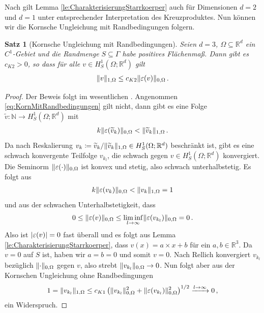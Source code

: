 \documentclass{scrartcl}
\newcounter{everything}
\newtheorem{theorem}[everything]{Satz}
\def\R{\mathbb{R}}
\def\N{\mathbb{N}}
\def\e{\varepsilon}
\DeclarePairedDelimiter{\abs}{\lvert}{\rvert}
\DeclarePairedDelimiter{\norm}{\lVert}{\rVert}
\begin{document}
Nach \cite[S.115]{Kik-1988} gilt Lemma \ref{le:CharakterisierungStarrkoerper} auch für Dimensionen $d=2$ und $d=1$ unter entsprechender Interpretation des Kreuzproduktes. Nun können wir die Kornsche Ungleichung mit Randbedingungen folgern.

\begin{theorem}[Kornsche Ungleichung mit Randbedingungen]
\label{th:KornMitRandbedingungen}
Seien $d=3$, $\Omega\subseteq\R^d$ ein $C^1$-Gebiet und die Randmenge $S\subseteq\Gamma$ habe positives Flächenmaß. Dann gibt es $c_{K2}>0$, so dass für alle $v\in H^1_{S}(\Omega;\R^d)$ gilt
\begin{align}
	\norm{v}_{1,\Omega}\leq c_{K2}\norm{\e(v)}_{0,\Omega}\,.
	\label{eq:KornMitRandbedingungen}
\end{align}
\end{theorem}

\begin{proof}
Der Beweis folgt im wesentlichen \cite[S.294]{Cia-1988}. Angenommen \eqref{eq:KornMitRandbedingungen} gilt nicht, dann gibt es eine Folge $\widetilde{v}\colon\N\to H^{1}_{S}(\Omega;\R^d)$ mit
\begin{align*}
	k\norm{\e(\widetilde{v}_k)}_{0,\Omega}<\norm{\widetilde{v}_k}_{1,\Omega}\,.
\end{align*}
Da nach Reskalierung $v_k\coloneqq \widetilde{v}_k/\norm{\widetilde{v}_k}_{1,\Omega}\in H^{1}_{S}(\Omega;\R^d)$ beschränkt ist, gibt es eine schwach konvergente Teilfolge $v_{k_l}$, die schwach gegen $v\in H^1_{S}(\Omega;\R^d)$ konvergiert. Die Seminorm $\norm{\e(\cdot)}_{0,\Omega}$ ist konvex und stetig, also schwach unterhalbstetig. Es folgt aus
\begin{align*}
	k\norm{\e(v_k)}_{0,\Omega}<\norm{v_k}_{1,\Omega}=1
\end{align*}
und aus der schwachen Unterhalbstetigkeit, dass
\begin{align*}
	0\leq \norm{\e(v)}_{0,\Omega}\leq\liminf_{l\to\infty}\norm{\e(v_{k_l})}_{0,\Omega}=0\,.
\end{align*}
Also ist $\abs{\e(v)}=0$ fast überall und es folgt aus Lemma \ref{le:CharakterisierungStarrkoerper}, dass $v(x)=a\times x+b$ für ein $a,b\in\R^3$. Da $v=0$ auf $S$ ist, haben wir $a=b=0$ und somit $v=0$.  Nach Rellich konvergiert $v_{k_l}$ bezüglich $\norm{\cdot}_{0,\Omega}$ gegen $v$, also strebt $\norm{v_{k_l}}_{0,\Omega}\to0$. Nun folgt aber aus der Kornschen Ungleichung ohne Randbedingungen
\begin{align*}
	1 = \norm{v_{k_l}}_{1,\Omega}\leq c_{K1}\left(\norm{v_{k_l}}_{0,\Omega}^2+\norm{\e(v_{k_l})}_{0,\Omega}^2\right)^{1/2}
	\xrightarrow{l\to\infty}0\,,
\end{align*}
ein Widerspruch.
\end{proof}
\end{document}
